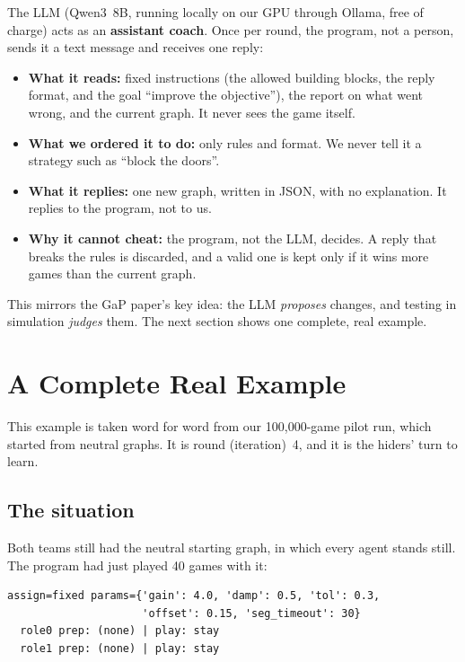 \documentclass[11pt]{article}
\begin{document}
The LLM (Qwen3~8B, running locally on our GPU through Ollama, free of charge) acts
as an \textbf{assistant coach}. Once per round, the program, not a person,
sends it a text message and receives one reply:

\begin{itemize}
  \item \textbf{What it reads:} fixed instructions (the allowed building blocks,
  the reply format, and the goal ``improve the objective''), the report on what
  went wrong, and the current graph. It never sees the game itself.
  \item \textbf{What we ordered it to do:} only rules and format. We never tell
  it a strategy such as ``block the doors''.
  \item \textbf{What it replies:} one new graph, written in JSON, with no
  explanation. It replies to the program, not to us.
  \item \textbf{Why it cannot cheat:} the program, not the LLM, decides. A reply
  that breaks the rules is discarded, and a valid one is kept only if it wins more
  games than the current graph.
\end{itemize}

This mirrors the GaP paper's key idea: the LLM \emph{proposes} changes, and
testing in simulation \emph{judges} them. The next section shows one complete,
real example.

\section{A Complete Real Example}
\label{sec:example}

This example is taken word for word from our 100{,}000-game pilot run, which
started from neutral graphs. It is round (iteration)~4, and it is the hiders'
turn to learn.

\subsection{The situation}

Both teams still had the neutral starting graph, in which every agent stands
still. The program had just played 40 games with it:

{\small
\begin{verbatim}
assign=fixed params={'gain': 4.0, 'damp': 0.5, 'tol': 0.3,
                     'offset': 0.15, 'seg_timeout': 30}
  role0 prep: (none) | play: stay
  role1 prep: (none) | play: stay
\end{verbatim}
}
\end{document}
